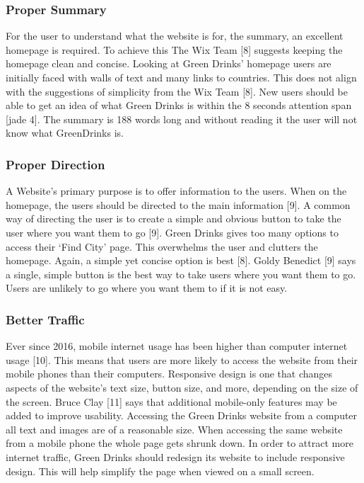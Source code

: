 \documentclass[12pt]{article}
\begin{document}
\subsubsection*{Proper Summary }  
For the user to understand what the website is for, the summary, an excellent homepage is required. To achieve this The Wix Team [8] suggests keeping the homepage clean and concise.
Looking at Green Drinks’ homepage users are initially faced with walls of text and many links to countries. This does not align with the suggestions of simplicity from the Wix Team [8].  New users should be able to get an idea of what Green Drinks is within the 8 seconds attention span [jade 4]. The summary is 188 words long and without reading it the user will not know what GreenDrinks is. 

\subsubsection*{Proper Direction}
A Website’s primary purpose is to offer information to the users. When on the homepage, the users should be directed to the main information [9]. A common way of directing the user is to create a simple and obvious button to take the user where you want them to go [9]. 
Green Drinks gives too many options to access their ‘Find City’ page. This overwhelms the user and clutters the homepage. Again, a simple yet concise option is best [8]. Goldy Benedict [9] says a single, simple button is the best way to take users where you want them to go. Users are unlikely to go where you want them to if it is not easy.

\subsubsection*{Better Traffic}
Ever since 2016, mobile internet usage has been higher than computer internet usage [10]. This means that users are more likely to access the website from their mobile phones than their computers. Responsive design is one that changes aspects of the website’s text size, button size, and more, depending on the size of the screen.  Bruce Clay [11] says that additional mobile-only features may be added to improve usability. 
Accessing the Green Drinks website from a computer all text and images are of a reasonable size. When accessing the same website from a mobile phone the whole page gets shrunk down. In order to attract more internet traffic, Green Drinks should redesign its website to include responsive design. This will help simplify the page when viewed on a small screen.
\end{document}

